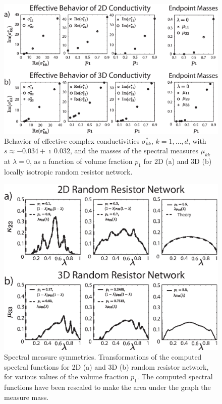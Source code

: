 \documentclass{cmslatex}
\begin{document}
%
\begin{figure}[t]
  \centerline{\includegraphics[scale=0.68]{Effective_Parameter_Behavior_4_75GHz.eps}} 
\caption{Behavior of effective complex conductivities $\sigma^*_{kk}$,
  $k=1,\ldots,d$, with $s\approx-0.034+\imath\,0.032$, and the masses of the spectral
  measures $\mu_{kk}$ at $\lambda=0$, as a function of volume fraction $p_1$
  for 2D (a) and 3D (b) locally isotropic random resistor network.   
        }
\label{fig:Effective_Parameter_Behavior}
\end{figure}
%



%
\begin{figure}[t]
  \centerline{\includegraphics[scale=0.97]{Spectral_Function_Symmetries.eps}} 
\caption{Spectral measure symmetries. Transformations of the computed
  spectral functions for 2D (a) and 3D (b) random resistor network,
  for various values of the volume fraction $p_1$. The computed
  spectral functions have been rescaled to make the area under the
  graph the measure mass.   
        }
\label{fig:Spectral_Function_Symmetries}
\end{figure}
%
\end{document}
